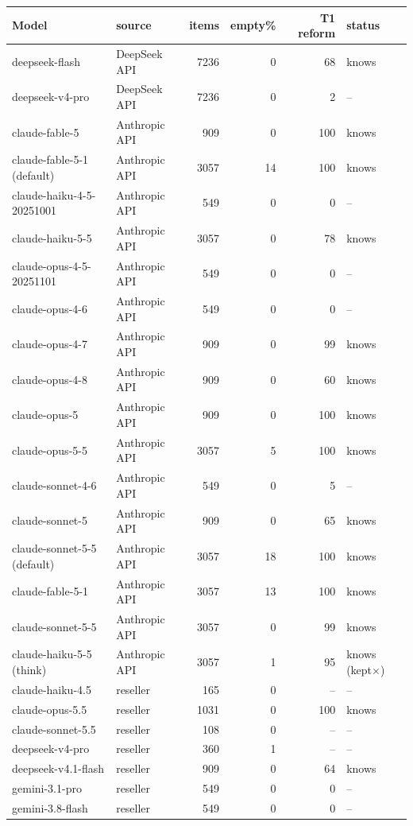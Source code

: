 \begin{tabular}{@{}l l r r r l@{}}
\toprule
Model & source & items & empty\% & T1 reform & status \\
\midrule
deepseek-flash & DeepSeek API & 7236 & 0 & 68 & knows \\
deepseek-v4-pro & DeepSeek API & 7236 & 0 & 2 & -- \\
claude-fable-5 & Anthropic API & 909 & 0 & 100 & knows \\
claude-fable-5-1 (default) & Anthropic API & 3057 & 14 & 100 & knows \\
claude-haiku-4-5-20251001 & Anthropic API & 549 & 0 & 0 & -- \\
claude-haiku-5-5 & Anthropic API & 3057 & 0 & 78 & knows \\
claude-opus-4-5-20251101 & Anthropic API & 549 & 0 & 0 & -- \\
claude-opus-4-6 & Anthropic API & 549 & 0 & 0 & -- \\
claude-opus-4-7 & Anthropic API & 909 & 0 & 99 & knows \\
claude-opus-4-8 & Anthropic API & 909 & 0 & 60 & knows \\
claude-opus-5 & Anthropic API & 909 & 0 & 100 & knows \\
claude-opus-5-5 & Anthropic API & 3057 & 5 & 100 & knows \\
claude-sonnet-4-6 & Anthropic API & 549 & 0 & 5 & -- \\
claude-sonnet-5 & Anthropic API & 909 & 0 & 65 & knows \\
claude-sonnet-5-5 (default) & Anthropic API & 3057 & 18 & 100 & knows \\
claude-fable-5-1 & Anthropic API & 3057 & 13 & 100 & knows \\
claude-sonnet-5-5 & Anthropic API & 3057 & 0 & 99 & knows \\
claude-haiku-5-5 (think) & Anthropic API & 3057 & 1 & 95 & knows (kept$\times$) \\
claude-haiku-4.5 & reseller & 165 & 0 & -- & -- \\
claude-opus-5.5 & reseller & 1031 & 0 & 100 & knows \\
claude-sonnet-5.5 & reseller & 108 & 0 & -- & -- \\
deepseek-v4-pro & reseller & 360 & 1 & -- & -- \\
deepseek-v4.1-flash & reseller & 909 & 0 & 64 & knows \\
gemini-3.1-pro & reseller & 549 & 0 & 0 & -- \\
gemini-3.8-flash & reseller & 549 & 0 & 0 & -- \\

\end{tabular}
